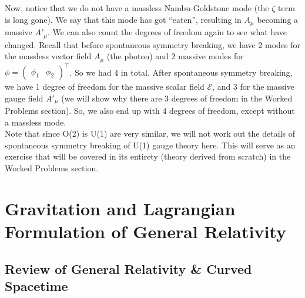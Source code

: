 \documentclass{book}
\numberwithin{equation}{section}
\theoremstyle{definition}
\begin{document}
Now, notice that we do not have a massless Nambu-Goldstone mode (the $\zeta$ term is long gone). We say that this mode has got ``eaten'', resulting in $A_\mu$ becoming a massive $A'_\mu$. We can also count the degrees of freedom again to see what have changed. Recall that before spontaneous symmetry breaking, we have 2 modes for the massless vector field $A_\mu$ (the photon) and 2 massive modes for $\phi = \begin{pmatrix}
\phi_1 & \phi_2
\end{pmatrix}^\top$. So we had 4 in total. After spontaneous symmetry breaking, we have 1 degree of freedom for the massive scalar field $\mathcal{E}$, and 3 for the massive gauge field $A'_\mu$ (we will show why there are 3 degrees of freedom in the Worked Problems section). So, we also end up with 4 degrees of freedom, except without a massless mode. \\

Note that since O(2) is U(1) are very similar, we will not work out the details of spontaneous symmetry breaking of U(1) gauge theory here. This will serve as an exercise that will be covered in its entirety (theory derived from scratch) in the Worked Problems section. \\




































\newpage

\chapter{Gravitation and Lagrangian Formulation of General Relativity}

\section{Review of General Relativity \& Curved Spacetime}
\end{document}
